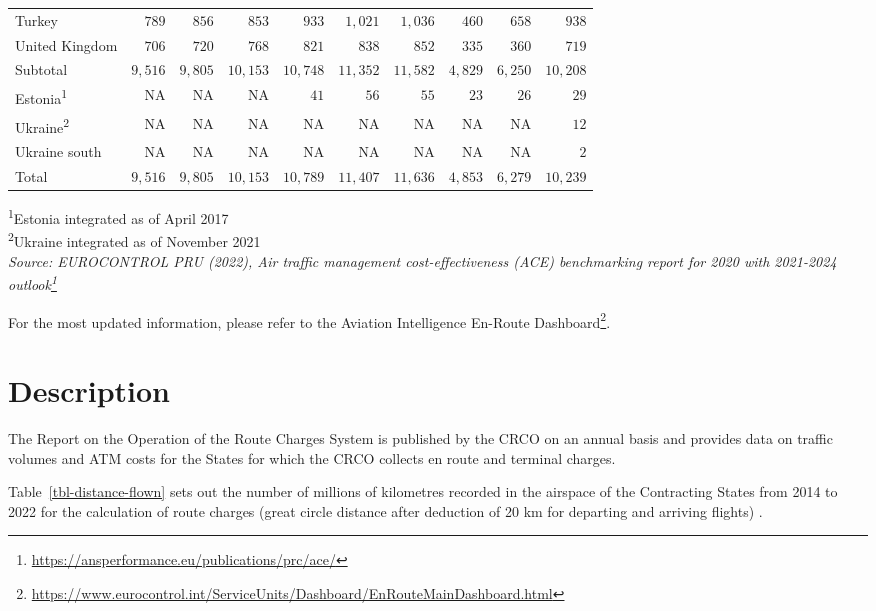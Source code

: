 \documentclass[
  11pt,
  a4paper,
]{book}
\DeclareRobustCommand{\href}[2]{#2\footnote{\url{#1}}}
\begin{document}
\begin{longtable}{lrrrrrrrrr}
Turkey & $789$ & $856$ & $853$ & $933$ & $1,021$ & $1,036$ & $460$ & $658$ & $938$ \\ 
United Kingdom & $706$ & $720$ & $768$ & $821$ & $838$ & $852$ & $335$ & $360$ & $719$ \\ 
Subtotal & $9,516$ & $9,805$ & $10,153$ & $10,748$ & $11,352$ & $11,582$ & $4,829$ & $6,250$ & $10,208$ \\ 
Estonia\textsuperscript{1} & NA & NA & NA & $41$ & $56$ & $55$ & $23$ & $26$ & $29$ \\ 
Ukraine\textsuperscript{2} & NA & NA & NA & NA & NA & NA & NA & NA & $12$ \\ 
Ukraine south & NA & NA & NA & NA & NA & NA & NA & NA & $2$ \\ 
Total & $9,516$ & $9,805$ & $10,153$ & $10,789$ & $11,407$ & $11,636$ & $4,853$ & $6,279$ & $10,239$ \\ 
\bottomrule
\end{longtable}
\begin{minipage}{\linewidth}
\textsuperscript{1}Estonia integrated as of April 2017\\
\textsuperscript{2}Ukraine integrated as of November 2021\\
\emph{Source: \href{https://ansperformance.eu/publications/prc/ace/}{EUROCONTROL PRU (2022), Air traffic management cost-effectiveness (ACE) benchmarking report for 2020 with 2021-2024 outlook}}\\
\end{minipage}

For the most updated information, please refer to the
\href{https://www.eurocontrol.int/ServiceUnits/Dashboard/EnRouteMainDashboard.html}{Aviation
Intelligence En-Route Dashboard}.

\hypertarget{description-8}{%
\section{Description}\label{description-8}}

The Report on the Operation of the Route Charges System is published by
the CRCO on an annual basis and provides data on traffic volumes and ATM
costs for the States for which the CRCO collects en route and terminal
charges.

Table~\ref{tbl-distance-flown} sets out the number of millions of
kilometres recorded in the airspace of the Contracting States from 2014
to 2022 for the calculation of route charges (great circle distance
after deduction of 20 km for departing and arriving flights) .
\end{document}
